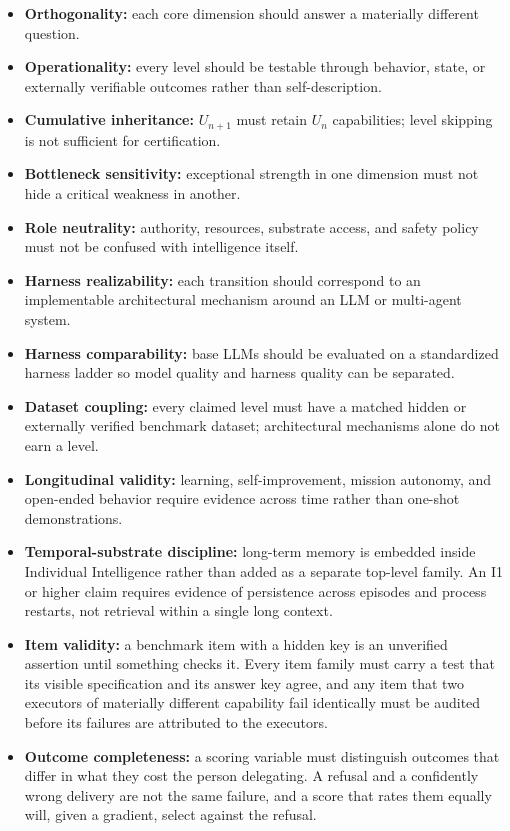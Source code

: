\documentclass[11pt]{article}
\theoremstyle{definition}
\begin{document}
\begin{itemize}
\item \textbf{Orthogonality:} each core dimension should answer a materially different question.
\item \textbf{Operationality:} every level should be testable through behavior, state, or externally verifiable outcomes rather than self-description.
\item \textbf{Cumulative inheritance:} $U_{n+1}$ must retain $U_n$ capabilities; level skipping is not sufficient for certification.
\item \textbf{Bottleneck sensitivity:} exceptional strength in one dimension must not hide a critical weakness in another.
\item \textbf{Role neutrality:} authority, resources, substrate access, and safety policy must not be confused with intelligence itself.
\item \textbf{Harness realizability:} each transition should correspond to an implementable architectural mechanism around an LLM or multi-agent system.
\item \textbf{Harness comparability:} base LLMs should be evaluated on a standardized harness ladder so model quality and harness quality can be separated.
\item \textbf{Dataset coupling:} every claimed level must have a matched hidden or externally verified benchmark dataset; architectural mechanisms alone do not earn a level.
\item \textbf{Longitudinal validity:} learning, self-improvement, mission autonomy, and open-ended behavior require evidence across time rather than one-shot demonstrations.
\item \textbf{Temporal-substrate discipline:} long-term memory is embedded inside Individual Intelligence rather than added as a separate top-level family. An I1 or higher claim requires evidence of persistence across episodes and process restarts, not retrieval within a single long context.
\item \textbf{Item validity:} a benchmark item with a hidden key is an unverified assertion until something checks it. Every item family must carry a test that its visible specification and its answer key agree, and any item that two executors of materially different capability fail identically must be audited before its failures are attributed to the executors.
\item \textbf{Outcome completeness:} a scoring variable must distinguish outcomes that differ in what they cost the person delegating. A refusal and a confidently wrong delivery are not the same failure, and a score that rates them equally will, given a gradient, select against the refusal.
\end{itemize}
\end{document}
